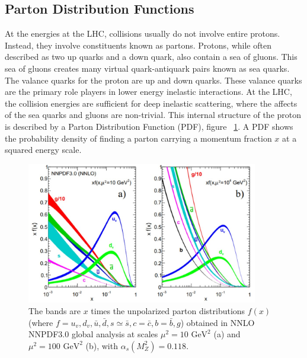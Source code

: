 \subsection{Parton Distribution Functions}
\indent At the energies at the LHC, collisions usually do not involve entire protons. Instead, they involve constituents known as partons. Protons, while often described as two up quarks and a down quark, also contain a sea of gluons. This sea of gluons creates many virtual quark-antiquark pairs known as sea quarks. The valance quarks for the proton are up and down quarks. These valance quarks are the primary role players in lower energy inelastic interactions. At the LHC, the collision energies are sufficient for deep inelastic scattering, where the affects of the sea quarks and gluons are non-trivial. 
This internal structure of the proton is described  by a Parton Distribution Function (PDF), figure ~\ref{fig:pdf}. A PDF shows the probability density of finding a parton carrying a momentum fraction ${x}$ at a squared energy scale. %
\newline

\begin{figure}[h]
\begin{center}
\includegraphics*[width=0.9\textwidth] {figures/pdf.jpg}
\caption[Parton distribution function]{The bands are ${x}$ times the unpolarized parton distributions
${f(x)}$ (where ${f = u_{v}, d_{v}, \bar{u}, \bar{d}, s \simeq{} \bar{s}, c = \bar{c}, b = \bar{b}, g}$) obtained in NNLO NNPDF3.0
global analysis at scales ${\mu^{2} = 10  \text{ GeV}^{2}}$
(a) and ${\mu^{2} = 100  \text{ GeV}^{2}}$ (b), with
${\alpha_{s}(M^{2}_{Z}) = 0.118}$.}
\label{fig:pdf}
\end{center}
\end{figure}

